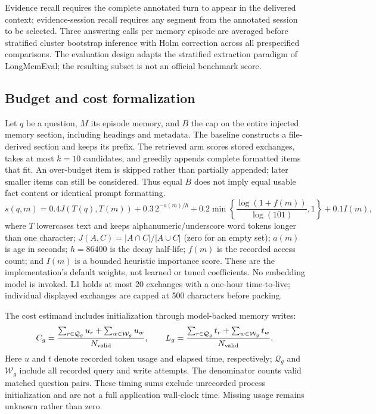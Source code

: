 Evidence recall requires the complete annotated turn to appear in the delivered context; evidence-session recall requires any segment from the annotated session to be selected. Three answering calls per memory episode are averaged before stratified cluster bootstrap inference with Holm correction across all prespecified comparisons. The evaluation design adapts the stratified extraction paradigm of LongMemEval; the resulting subset is not an official benchmark score.

\FloatBarrier

\subsection{Budget and cost formalization}
Let $q$ be a question, $M$ its episode memory, and $B$ the cap on the entire
injected memory section, including headings and metadata. The baseline constructs
a file-derived section and keeps its prefix. The retrieved arm scores stored
exchanges, takes at most $k=10$ candidates, and greedily appends complete formatted
items that fit. An over-budget item is skipped rather than partially appended;
later smaller items can still be considered. Thus equal $B$ does not imply equal
usable fact content or identical prompt formatting.
\begin{equation}
  s(q,m)=0.4J(T(q),T(m))+0.3\,2^{-a(m)/h}
       +0.2\min\!\left\{\frac{\log(1+f(m))}{\log(101)},1\right\}+0.1I(m),
  \label{eq:ranking}
\end{equation}
where $T$ lowercases text and keeps alphanumeric/underscore word tokens longer
than one character; $J(A,C)=|A\cap C|/|A\cup C|$ (zero for an empty set);
$a(m)$ is age in seconds; $h=86400$ is the decay half-life; $f(m)$ is the recorded
access count; and $I(m)$ is a bounded heuristic importance score. These are the
implementation's default weights, not learned or tuned coefficients. No embedding
model is invoked. L1 holds at most 20 exchanges with a one-hour time-to-live;
individual displayed exchanges are capped at 500 characters before packing.

The cost estimand includes initialization through model-backed memory writes:
\begin{equation}
 C_g=\frac{\sum_{r\in\mathcal{Q}_g}u_r+
                 \sum_{w\in\mathcal{W}_g}u_w}{N_{\rm valid}},\qquad
 L_g=\frac{\sum_{r\in\mathcal{Q}_g}t_r+
                 \sum_{w\in\mathcal{W}_g}t_w}{N_{\rm valid}}.
 \label{eq:accounting}
\end{equation}
Here $u$ and $t$ denote recorded token usage and elapsed time, respectively;
$\mathcal Q_g$ and $\mathcal W_g$ include all recorded query and write attempts.
The denominator counts valid matched question pairs. These timing sums exclude
unrecorded process initialization and are not a full application wall-clock time.
Missing usage remains unknown rather than zero.

